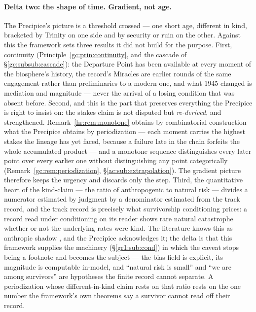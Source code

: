 \documentclass[11pt]{article}
\numberwithin{equation}{section}
\theoremstyle{plain}
\theoremstyle{definition}
\theoremstyle{remark}
\begin{document}
\paragraph{Delta two: the shape of time. Gradient, not age.} The
Precipice's picture is a threshold crossed --- one short age, different
in kind, bracketed by Trinity on one side and by security or ruin on
the other. Against this the framework sets three results it did not
build for the purpose. First, continuity
(Principle~\ref{gc:prin:continuity}, and the cascade of
\S\ref{gc:subsub:cascade}): the Departure Point has been available at
every moment of the biosphere's history, the record's Miracles are
earlier rounds of the same engagement rather than preliminaries to a
modern one, and what 1945 changed is mediation and magnitude ---
never the arrival of a losing condition that was absent before.
Second, and this is the part that preserves everything the Precipice
is right to insist on: the stakes claim is not disputed but
\emph{re-derived}, and strengthened. Remark~\ref{hr:rem:monotone}
obtains by combinatorial construction what the Precipice obtains by
periodization --- each moment carries the highest stakes the lineage
has yet faced, because a failure late in the chain forfeits the whole
accumulated product --- and a monotone sequence distinguishes every
later point over every earlier one without distinguishing any point
categorically (Remark~\ref{gc:rem:periodization},
\S\ref{ac:sub:extrapolation}). The gradient picture therefore keeps
the urgency and discards only the step. Third, the quantitative heart
of the kind-claim --- the ratio of anthropogenic to natural risk ---
divides a numerator estimated by judgment by a denominator estimated
from the track record, and the track record is precisely what
survivorship conditioning prices: a record read under conditioning on
its reader shows rare natural catastrophe whether or not the
underlying rates were kind. The literature knows this as anthropic
shadow \cite{CSB10}, and the Precipice acknowledges it; the delta is
that this framework supplies the machinery
(\S\ref{gr1:sub:cond}) in which the caveat stops being a footnote and
becomes the subject --- the bias field is explicit, its magnitude is
computable in-model, and ``natural risk is small'' and ``we are among
survivors'' are hypotheses the finite record cannot separate. A
periodization whose different-in-kind claim rests on that ratio rests
on the one number the framework's own theorems say a survivor cannot
read off their record.
\end{document}
